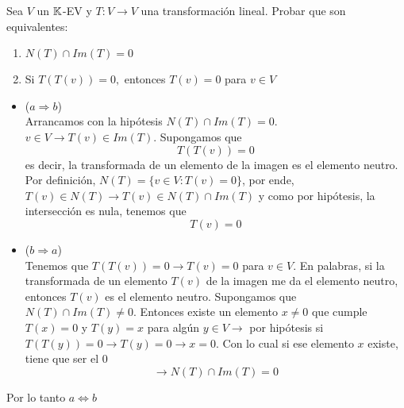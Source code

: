 \item Sea $V$ un $\mathbb{K}$-EV y $T:V\to V$ una transformación lineal. Probar que son equivalentes:
    \begin{enumerate}
        \item $N(T)\cap Im(T)={0}$
        \item Si $T(T(v))=0,$ entonces $T(v)=0$ para $v\in V$
    \end{enumerate}
    \begin{mdframed}[style=s]
        \begin{itemize}
            \item ($a\Rightarrow b$)\\
                Arrancamos con la hipótesis $N(T)\cap Im(T)=0$. $v\in V\to T(v)\in Im(T)$. Supongamos que \[T(T(v))=0\]
                es decir, la transformada de un elemento de la imagen es el elemento neutro. Por definición, $N(T)=\{v\in V:T(v)=0\}$, por ende, $T(v)\in N(T)\to T(v)\in N(T)\cap Im(T)$ y como por hipótesis, la intersección es nula, tenemos que\[T(v)=0\]
            \item ($b\Rightarrow a$)\\
                Tenemos que $T(T(v))=0\to T(v)=0$ para $v\in V$. En palabras, si la transformada de un elemento $T(v)$ de la imagen me da el elemento neutro, entonces $T(v)$ es el elemento neutro. Supongamos que $N(T)\cap Im(T)\neq 0$. Entonces existe un elemento $x\neq0$ que cumple $T(x)=0$ y $T(y)=x$ para algún $y\in V\to$ por hipótesis si $T(T(y))=0\to T(y)=0\to x=0$. Con lo cual si ese elemento $x$ existe, tiene que ser el $0$\[\to N(T)\cap Im(T)=0\]
        \end{itemize}
        Por lo tanto $a\Leftrightarrow b$
    \end{mdframed}